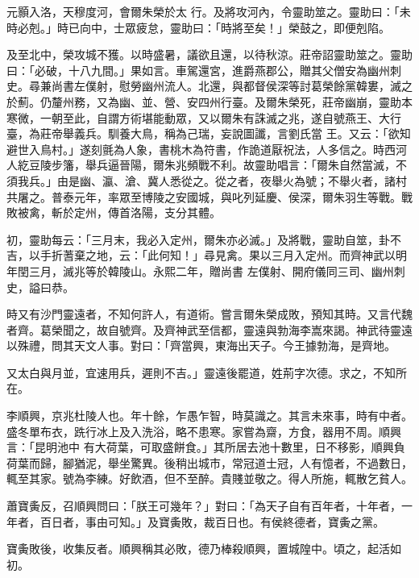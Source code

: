 \begin{pinyinscope}
 元顥入洛，天穆度河，會爾朱榮於太
 行。及將攻河內，令靈助筮之。靈助曰：「未時必剋。」時已向中，士眾疲怠，靈助曰：「時將至矣！」榮鼓之，即便剋陷。



 及至北中，榮攻城不獲。以時盛暑，議欲且還，以待秋涼。莊帝詔靈助筮之。靈助曰：「必破，十八九間。」果如言。車駕還宮，進爵燕郡公，贈其父僧安為幽州刺史。尋兼尚書左僕射，慰勞幽州流人。北還，與都督侯深等討葛榮餘黨韓婁，滅之於薊。仍釐州務，又為幽、並、營、安四州行臺。及爾朱榮死，莊帝幽崩，靈助本寒微，一朝至此，自謂方術堪能動眾，又以爾朱有誅滅之兆，遂自號燕王、大行臺，為莊帝舉義兵。馴養大鳥，稱為己瑞，妄說圖讖，言劉氏當
 王。又云：「欲知避世入鳥村。」遂刻氈為人象，書桃木為符書，作詭道厭祝法，人多信之。時西河人紇豆陵步籓，舉兵逼晉陽，爾朱兆頻戰不利。故靈助唱言：「爾朱自然當滅，不須我兵。」由是幽、瀛、滄、冀人悉從之。從之者，夜舉火為號；不舉火者，諸村共屠之。普泰元年，率眾至博陵之安國城，與叱列延慶、侯深，爾朱羽生等戰。戰敗被禽，斬於定州，傳首洛陽，支分其體。



 初，靈助每云：「三月末，我必入定州，爾朱亦必滅。」及將戰，靈助自筮，卦不吉，以手折蓍棄之地，云：「此何知！」尋見禽。果以三月入定州。而齊神武以明年閏三月，滅兆等於韓陵山。永熙二年，贈尚書
 左僕射、開府儀同三司、幽州刺史，謚曰恭。



 時又有沙門靈遠者，不知何許人，有道術。嘗言爾朱榮成敗，預知其時。又言代魏者齊。葛榮聞之，故自號齊。及齊神武至信都，靈遠與勃海李嵩來謁。神武待靈遠以殊禮，問其天文人事。對曰：「齊當興，東海出天子。今王據勃海，是齊地。



 又太白與月並，宜速用兵，遲則不吉。」靈遠後罷道，姓荊字次德。求之，不知所在。



 李順興，京兆杜陵人也。年十餘，乍愚乍智，時莫識之。其言未來事，時有中者。盛冬單布衣，跣行冰上及入洗浴，略不患寒。家嘗為齋，方食，器用不周。順興言：「昆明池中
 有大荷葉，可取盛餅食。」其所居去池十數里，日不移影，順興負荷葉而歸，腳猶泥，舉坐驚異。後稍出城市，常冠道士冠，人有憶者，不過數日，輒至其家。號為李練。好飲酒，但不至醉。貴賤並敬之。得人所施，輒散乞貧人。



 蕭寶夤反，召順興問曰：「朕王可幾年？」對曰：「為天子自有百年者，十年者，一年者，百日者，事由可知。」及寶夤敗，裁百日也。有侯終德者，寶夤之黨。



 寶夤敗後，收集反者。順興稱其必敗，德乃棒殺順興，置城隍中。頃之，起活如初。




\end{pinyinscope}
